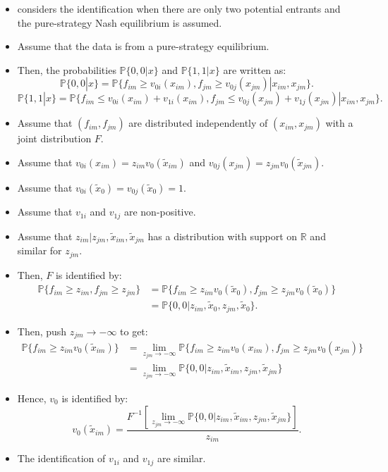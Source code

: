 \documentclass[]{book}
\begin{document}
\begin{itemize}
\item
  \citet{tamer_incomplete_2003} considers the identification when there
  are only two potential entrants and the pure-strategy Nash equilibrium
  is assumed.
\item
  Assume that the data is from a pure-strategy equilibrium.
\item
  Then, the probabilities \(\mathbb{P}\{0, 0|x\}\) and
  \(\mathbb{P}\{1, 1|x\}\) are written as: \[
  \mathbb{P}\{0, 0|x\} = \mathbb{P}\{f_{im} \ge v_{0i}(x_{im}), f_{jm} \ge v_{0j}(x_{jm})|x_{im}, x_{jm}\}.
  \] \[
  \mathbb{P}\{1, 1|x\} = \mathbb{P}\{f_{im} \le v_{0i}(x_{im}) + v_{1i}(x_{im}), f_{jm} \le v_{0j}(x_{jm}) + v_{1j}(x_{jm})|x_{im}, x_{jm}\}.
  \]
\item
  Assume that \((f_{im}, f_{jm})\) are distributed independently of
  \((x_{im}, x_{jm})\) with a joint distribution \(F\).
\item
  Assume that \(v_{0i}(x_{im}) = z_{im} v_0(\tilde{x}_{im})\) and
  \(v_{0j}(x_{jm}) = z_{jm} v_0(\tilde{x}_{jm})\).
\item
  Assume that \(v_{0i}(\tilde{x}_0) = v_{0j}(\tilde{x}_0) = 1\).
\item
  Assume that \(v_{1i}\) and \(v_{1j}\) are non-positive.
\item
  Assume that \(z_{im}| z_{jm}, \tilde{x}_{im}, \tilde{x}_{jm}\) has a
  distribution with support on \(\mathbb{R}\) and similar for
  \(z_{jm}\).
\item
  Then, \(F\) is identified by: \[
  \begin{split}
  \mathbb{P}\{f_{im} \ge z_{im}, f_{jm} \ge z_{jm}\} &= \mathbb{P}\{ f_{im} \ge z_{im} v_0(\tilde{x}_{0}), f_{jm} \ge z_{jm} v_0(\tilde{x}_{0})\}\\
  &= \mathbb{P}\{0, 0|z_{im}, \tilde{x}_0, z_{jm}, \tilde{x}_0\}.
  \end{split}
  \]
\item
  Then, push \(z_{jm} \to - \infty\) to get: \[
  \begin{split}
  \mathbb{P}\{f_{im} \ge z_{im} v_0(\tilde{x}_{im})\} &= \lim_{z_{jm} \to - \infty} \mathbb{P}\{f_{im} \ge z_{im} v_0(x_{im}), f_{jm} \ge z_{jm} v_0(x_{jm})\}\\
  &= \lim_{z_{jm} \to - \infty} \mathbb{P}\{0, 0|z_{im}, \tilde{x}_{im}, z_{jm}, \tilde{x}_{jm}\}
  \end{split}
  \]
\item
  Hence, \(v_{0}\) is identified by: \[
  v_0(\tilde{x}_{im}) = \frac{F^{-1}[\lim_{z_{jm} \to - \infty} \mathbb{P}\{0, 0|z_{im}, \tilde{x}_{im}, z_{jm}, \tilde{x}_{jm}\}]}{z_{im}}.
  \]
\item
  The identification of \(v_{1i}\) and \(v_{1j}\) are similar.
\end{itemize}
\end{document}
